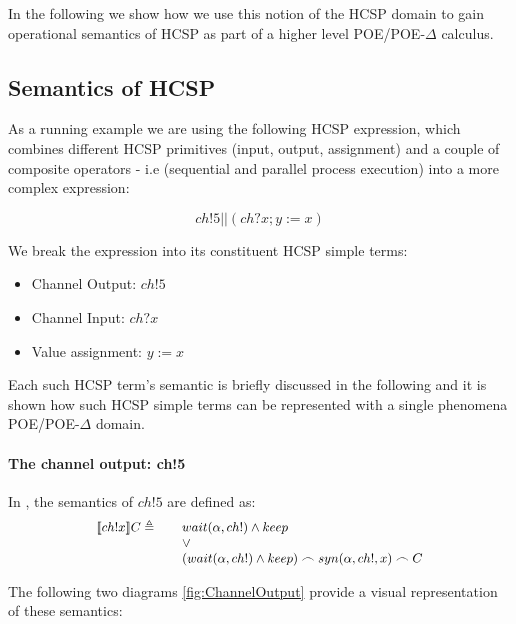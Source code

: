 \documentclass[runningheads,a4paper]{llncs}
\begin{document}
             In the following we show how we use this notion of the
             HCSP domain to gain operational semantics of HCSP as part
             of a higher level POE/POE-$\Delta$ calculus.

             \subsection{Semantics of HCSP}
             \label{subsect:phenomhcsp.semantics}
             As a running example we are using the following HCSP
             expression, which combines different HCSP
             primitives (input, output, assignment) and a couple of
             composite operators - i.e (sequential and parallel
             process execution) into a more complex expression:

             \[ch!5 || (ch?x; y := x)\]

             We break the expression into its constituent HCSP simple
             terms:
             \begin{itemize}
             \item Channel Output: $ch!5$
             \item Channel Input: $ch?x$
             \item Value assignment: $y:=x$
             \end{itemize}
             Each such HCSP term's semantic is briefly discussed in the
             following and it is shown how such HCSP simple terms can be
             represented with a single phenomena POE/POE-$\Delta$
             domain.
             
\paragraph{The channel output: ch!5}

In \cite{chaochen1996formal}, the semantics of $ch!5$ are
defined as:
\[\footnotesize\begin{array}{rcll}
                 \llbracket ch!x \rrbracket C \triangleq && wait(\alpha, ch!) \wedge keep \\
                                                         &&\vee \\
                                                         && (wait(\alpha, ch!) \wedge keep) \frown syn(\alpha, ch!, x) \frown C
               \end{array}\]

The following two diagrams \ref{fig:ChannelOutput} provide a visual
representation of these semantics: 
\end{document}
